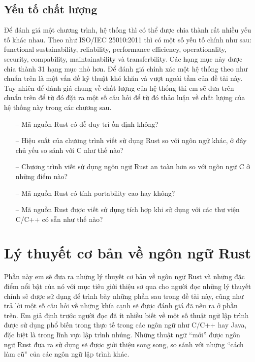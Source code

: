 \subsection{Yếu tố chất lượng}\label{lbl:quality_iso}
Để đánh giá một chương trình, hệ thống thì có thể được chia thành rất nhiều yếu tố khác nhau.
Theo như ISO/IEC 25010:2011 thì có một số yếu tố chính như sau: functional sustainability, reliability, performance efficiency, operationality, security, compability, maintainability và transferbility. Các hạng mục này được chia thành 31 hạng mục nhỏ hơn.
Để đánh giá chính xác một hệ thống theo như chuẩn trên là một vấn đề kỹ thuật khó khăn và vượt ngoài tầm của đề tài này.
Tuy nhiên để đánh giá chung về chất lượng của hệ thống thì em sẽ dưa trên chuẩn trên để từ đó đặt ra một số câu hỏi để từ đó thảo luận về chất lượng của hệ thống này trong các chương sau.
\begin{itemize}
    \item[--] Mã nguồn Rust có dễ duy trì ồn định không?
    \item[--] Hiệu suất của chương trình viết sử dụng Rust so với ngôn ngữ khác, ở đây chủ yếu so sánh với C như thế nào?
    \item[--] Chương trình viết sử dụng ngôn ngữ Rust an toàn hơn so với ngôn ngữ C ở những điểm nào?
    \item[--] Mã nguồn Rust có tính portability cao hay không?
    \item[--] Mã nguồn Rust được viết sử dụng tích hợp khi sử dụng với các thư viện C/C++ có sẵn như thế nào?
\end{itemize}

\section{Lý thuyết cơ bản về ngôn ngữ Rust}
Phần này em sẽ đưa ra những lý thuyết cơ bản về ngôn ngữ Rust và những đặc điểm nổi bật của nó với mục tiêu giới thiệu sơ qua cho người đọc những lý thuyết chính sẽ được sử dụng để trình bày những phần sau trong đề tài này, cũng như trả lời một số câu hỏi về những khía cạnh sẽ được đánh giá đã nêu ra ở phần trên.
Em giả định trước người đọc đã ít nhiều biết về một số thuật ngữ lập trình được sử dụng phổ biến trong thực tế trong các ngôn ngữ như C/C++ hay Java, đặc biệt là trong lĩnh vực lập trình nhúng.
Những thuật ngữ ``mới'' được ngôn ngữ Rust đưa ra sử dụng sẽ được giới thiệu song song, so sánh với những ``cách làm cũ'' của các ngôn ngữ lập trình khác.

